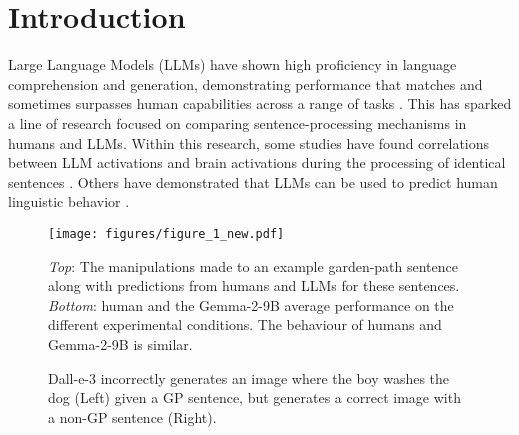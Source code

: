 \section{Introduction}
Large Language Models (LLMs) have shown high proficiency in language comprehension and generation, demonstrating performance that matches and sometimes surpasses human capabilities across a range of tasks \cite{gpt4, llama2023, falcon40b, llama3herdmodels, geminiteam2024gemini}. This has sparked a line of research focused on comparing sentence-processing mechanisms in humans and LLMs. Within this research, some studies have found correlations between LLM activations and brain activations during the processing of identical sentences \cite{cacheteux-middle-layer, fedorenko_brain_corr, Ren2024DoLL}. Others have demonstrated that LLMs can be used to predict human linguistic behavior \cite{linzen-etal-2016-assessing, acceptability_nn, hu-etal-2020-systematic, Rego2024LanguageMO, Sun2024ComputationalSM, kuribayashi2025large}.

\begin{figure}[t!]
    \centering
    \texttt{[image: figures/figure\_1\_new.pdf]} 
    \caption{\emph{Top}: The manipulations made to an example garden-path sentence along with predictions from humans and LLMs for these sentences. \emph{Bottom}: human and the Gemma-2-9B average performance on the different experimental conditions. The behaviour of humans and Gemma-2-9B is similar.}
    \label{fig:human_next_llm}
\end{figure}

\begin{figure*}[t]
    \centering
    \scriptsize
    \qquad
    \caption{Dall-e-3 incorrectly generates an image where the boy washes the dog (Left) given a GP sentence, but generates a correct image with a non-GP sentence (Right).}
    \label{fig:dalle_fig1}
\end{figure*}

